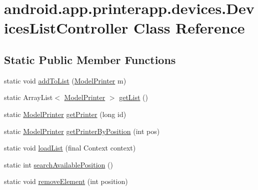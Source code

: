\hypertarget{classandroid_1_1app_1_1printerapp_1_1devices_1_1_devices_list_controller}{}\section{android.\+app.\+printerapp.\+devices.\+Devices\+List\+Controller Class Reference}
\label{classandroid_1_1app_1_1printerapp_1_1devices_1_1_devices_list_controller}
\subsection*{Static Public Member Functions}
\begin{DoxyCompactItemize}
\item 
static void \hyperlink{classandroid_1_1app_1_1printerapp_1_1devices_1_1_devices_list_controller_aa698432b0468844d55ae863154ec3195}{add\+To\+List} (\hyperlink{classandroid_1_1app_1_1printerapp_1_1model_1_1_model_printer}{Model\+Printer} m)
\item 
static Array\+List$<$ \hyperlink{classandroid_1_1app_1_1printerapp_1_1model_1_1_model_printer}{Model\+Printer} $>$ \hyperlink{classandroid_1_1app_1_1printerapp_1_1devices_1_1_devices_list_controller_a83b9039a1af04dfc0ab1e10787c7357a}{get\+List} ()
\item 
static \hyperlink{classandroid_1_1app_1_1printerapp_1_1model_1_1_model_printer}{Model\+Printer} \hyperlink{classandroid_1_1app_1_1printerapp_1_1devices_1_1_devices_list_controller_abbcd6a2b6a7ea050d7cd60b2c26f4417}{get\+Printer} (long id)
\item 
static \hyperlink{classandroid_1_1app_1_1printerapp_1_1model_1_1_model_printer}{Model\+Printer} \hyperlink{classandroid_1_1app_1_1printerapp_1_1devices_1_1_devices_list_controller_a577f2dfdeea8ca0b586abf439a22e3ef}{get\+Printer\+By\+Position} (int pos)
\item 
static void \hyperlink{classandroid_1_1app_1_1printerapp_1_1devices_1_1_devices_list_controller_aad36f4528d03d029fa413522df983eab}{load\+List} (final Context context)
\item 
static int \hyperlink{classandroid_1_1app_1_1printerapp_1_1devices_1_1_devices_list_controller_a56266b41725389087671f4d9720e37d0}{search\+Available\+Position} ()
\item 
static void \hyperlink{classandroid_1_1app_1_1printerapp_1_1devices_1_1_devices_list_controller_a08aecd24b33b84b80e2cda1e181e8685}{remove\+Element} (int position)

\end{DoxyCompactItemize}
